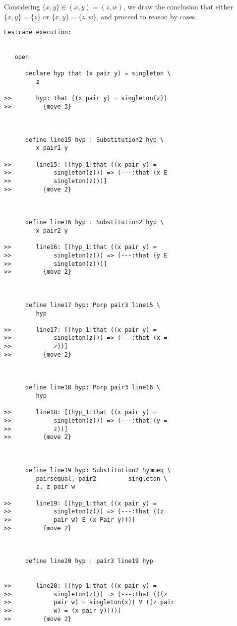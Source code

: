 \documentclass{article}
\begin{document}
Considering $\{x,y\} \in (x,y) = (z,w)$, we draw the conclusion that either $\{x,y\} = \{z\}$ or $\{x,y\} =\{z,w\}$, and proceed to reason by cases.

\begin{verbatim}Lestrade execution:


   open

      declare hyp that (x pair y) = singleton \
         z

>>       hyp: that ((x pair y) = singleton(z))
>>         {move 3}



      define line15 hyp : Substitution2 hyp \
         x pair1 y

>>       line15: [(hyp_1:that ((x pair y) =
>>            singleton(z))) => (---:that (x E
>>            singleton(z)))]
>>         {move 2}



      define line16 hyp : Substitution2 hyp \
         x pair2 y

>>       line16: [(hyp_1:that ((x pair y) =
>>            singleton(z))) => (---:that (y E
>>            singleton(z)))]
>>         {move 2}



      define line17 hyp: Porp pair3 line15 \
         hyp

>>       line17: [(hyp_1:that ((x pair y) =
>>            singleton(z))) => (---:that (x =
>>            z))]
>>         {move 2}



      define line18 hyp: Porp pair3 line16 \
         hyp

>>       line18: [(hyp_1:that ((x pair y) =
>>            singleton(z))) => (---:that (y =
>>            z))]
>>         {move 2}



      define line19 hyp: Substitution2 Symmeq \
         pairsequal, pair2         singleton \
         z, z pair w

>>       line19: [(hyp_1:that ((x pair y) =
>>            singleton(z))) => (---:that ((z
>>            pair w) E (x Pair y)))]
>>         {move 2}



      define line20 hyp : pair3 line19 hyp


>>       line20: [(hyp_1:that ((x pair y) =
>>            singleton(z))) => (---:that (((z
>>            pair w) = singleton(x)) V ((z pair
>>            w) = (x pair y))))]
>>         {move 2}


\end{verbatim}
\end{document}

